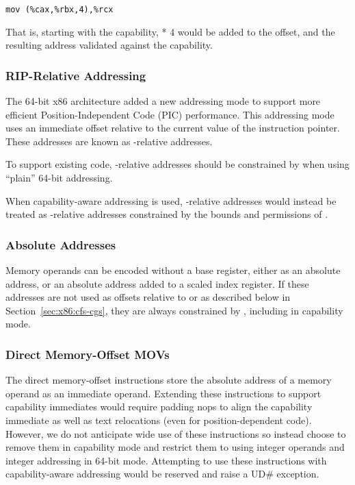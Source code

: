 \begin{verbatim}
mov (%cax,%rbx,4),%rcx
\end{verbatim}

That is, starting with the \CAX{} capability, \RBX{} * 4 would be added to the
offset, and the resulting address validated against the \CAX{} capability.

\subsubsection{RIP-Relative Addressing}

The 64-bit x86 architecture added a new addressing mode to support more
efficient Position-Independent Code (PIC) performance.
This addressing mode uses an immediate offset
relative to the current value of the instruction
pointer.  These addresses are known as \RIP{}-relative addresses.

To support existing code, \RIP{}-relative addresses should be constrained
by \DDC{} when using ``plain'' 64-bit addressing.

When capability-aware addressing is used, \RIP{}-relative addresses
would instead be treated as \CIP{}-relative addresses
constrained by the bounds and permissions of \CIP{}.

\subsubsection{Absolute Addresses}

Memory operands can be encoded without a base register, either as an
absolute address, or an absolute address added to a scaled index
register.  If these addresses are not used as offsets relative to
\CFS{} or \CGS{} as described below in Section~\ref{sec:x86:cfs-cgs},
they are always constrained by
\DDC{}, including in capability mode.

\subsubsection{Direct Memory-Offset MOVs}

The direct memory-offset  instructions store the
absolute address of a memory operand as an immediate operand.
Extending these instructions to support capability immediates would
require padding nops to align the capability immediate as well as text
relocations (even for position-dependent code).  However, we do not
anticipate wide use of these instructions so instead choose to
remove them in capability mode and restrict them to using integer
operands and integer addressing in 64-bit mode.  Attempting to use these instructions
with capability-aware addressing would be reserved and raise a UD\#
exception.

